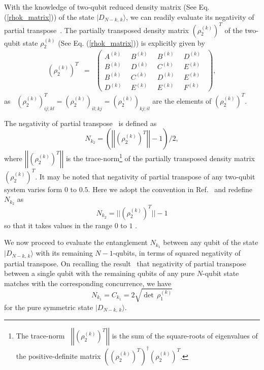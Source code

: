 \documentclass[pra,a4paper,showpacs,superscriptaddress]{revtex4}
\newcommand{\be}{\begin{equation}}
\newcommand{\ee}{\end{equation}}
\newcommand{\ba}[1]{\left(\begin{array}{#1}}
\newcommand{\ea}{\end{array}\right)}
\begin{document}
With the knowledge of two-qubit reduced density matrix (See Eq. (\ref{rhok_matrix})) of the state $\vert D_{N-k,\,k}\rangle$, we can readily evaluate its negativity of partial transpose~\cite{ppt1,ppt2,ppt3}. The partially transposed density matrix ${\left(\rho^{(k)}_2\right)}^T$ of the two-qubit state $\rho^{(k)}_2$ (See Eq. (\ref{rhok_matrix})) is explicitly given by
\begin{eqnarray}
\label{rho2pt}
{\left(\rho^{(k)}_2\right)}^T&=&\ba{cccc} A^{(k)} \ \ & B^{(k)} \ \ & B^{(k)}\ \  & D^{(k)} \ \  \\ B^{(k)} \ \  & D^{(k)}\ \  & C^{(k)}\ \  & E^{(k)} \ \   \\ B^{(k)} \ \  & C^{(k)} \ \  & D^{(k)} \ \ & E^{(k)} \ \  \\ D^{(k)} \ \  & E^{(k)} \ \  & E^{(k)} \ \  & F^{(k)} \ \  \ea,
\end{eqnarray} 
as~\cite{ppt1} ${\left(\rho^{(k)}_2\right)}^T_{ij;kl}={(\rho^{(k)}_2)}_{il;kj}={(\rho^{(k)}_2)}_{kj;il}$
are the elements of ${\left(\rho^{(k)}_2\right)}^T$. 

The negativity of partial transpose~\cite{ppt1,ppt2,ppt3}  
is defined as
\[
N_{k_2}=\left(\left\vert\left\vert {\left(\rho^{(k)}_2\right)}^T \right\vert \right\vert-1\right)/2,
\] 
where 
$\left\vert\left\vert {\left(\rho^{(k)}_2\right)}^T\right\vert\right\vert$ is the trace-norm\footnote{The trace-norm~\cite{ppt3} $\left\vert\left\vert {\left(\rho^{(k)}_2\right)}^T\right\vert \right\vert$ is the sum of the square-roots of eigenvalues of the positive-definite matrix $\left({{(\rho^{(k)}_2)}^T}\right)^\dag 
{\left(\rho^{(k)}_2\right)}^T$.} of the partially transposed density matrix 
${\left(\rho^{(k)}_2\right)}^T$.  It may be noted that negativity of partial transpose of any two-qubit system varies form  $0$ to  $0.5$. 
Here we adopt the convention in Ref.~\cite{neg} and redefine $N_{k_{2}}$ as   
\begin{equation} 
N_{k_{2}}=\vert\vert {(\rho^{(k)}_2)}^T \vert \vert-1 
\end{equation}
so that it takes values in the range $0$ to $1$  . 

We now proceed to evaluate the entanglement $N_{k_{1}}$ between any qubit of the state $\vert D_{N-k,\,k}\rangle$ with its remaining $N-1$-qubits, in terms of squared negativity of partial transpose. On recalling the result~\cite{neg} that negativity of partial transpose between a single qubit with the remaining qubits of any pure $N$-qubit state matches with the corresponding concurrence, we have  
\be
N_{k_{1}}=C_{k_{1}}=2\sqrt{\det\,\rho^{(k)}_1} 
\ee 
for the pure symmetric state $\vert D_{N-k,\,k}\rangle$. 
 
\end{document}
